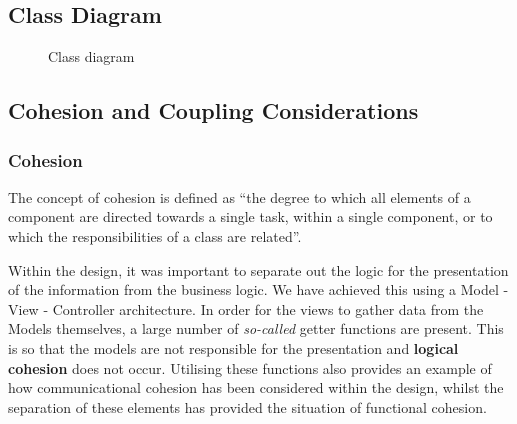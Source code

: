 \documentclass[
  english,
  a4paper,
,tablecaptionabove
]{scrartcl}
\begin{document}
\newpage

\begin{landscape}

\pagestyle{empty}

\hypertarget{class-diagram}{%
\section{Class Diagram}\label{class-diagram}}

\begin{figure}
    \caption{Class diagram} \label{fig:class_diagram}
\end{figure}

\end{landscape}

\newpage

\hypertarget{cohesion-and-coupling-considerations}{%
\subsection{Cohesion and Coupling
Considerations}\label{cohesion-and-coupling-considerations}}

\hypertarget{cohesion}{%
\subsubsection{Cohesion}\label{cohesion}}

The concept of cohesion is defined as \enquote{the degree to which all
elements of a component are directed towards a single task, within a
single component, or to which the responsibilities of a class are
related}.

Within the design, it was important to separate out the logic for the
presentation of the information from the business logic. We have
achieved this using a Model - View - Controller architecture. In order
for the views to gather data from the Models themselves, a large number
of \emph{so-called} getter functions are present. This is so that the
models are not responsible for the presentation and \textbf{logical
cohesion} does not occur. Utilising these functions also provides an
example of how communicational cohesion has been considered within the
design, whilst the separation of these elements has provided the
situation of functional cohesion.
\end{document}
